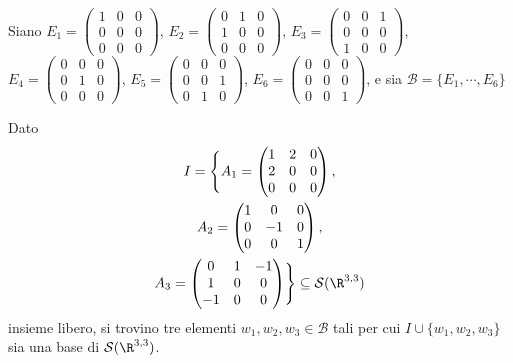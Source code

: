 \documentclass[twoside, 11pt, titlepage]{article}
\begin{document}
{Siano $E_1=\begin{pmatrix}
1 & 0 & 0\\
0 & 0 & 0\\
0 & 0 & 0
\end{pmatrix}$, $E_2=\begin{pmatrix}
0 & 1 & 0\\
1 & 0 & 0\\
0 & 0 & 0
\end{pmatrix}$, $E_3=\begin{pmatrix}
0 & 0 & 1\\
0 & 0 & 0\\
1 & 0 & 0
\end{pmatrix}$, $E_4=\begin{pmatrix}
0 & 0 & 0\\
0 & 1 & 0\\
0 & 0 & 0
\end{pmatrix}$, $E_5=\begin{pmatrix}
0 & 0 & 0\\
0 & 0 & 1\\
0 & 1 & 0
\end{pmatrix}$, $E_6=\begin{pmatrix}
0 & 0 & 0\\
0 & 0 & 0\\
0 & 0 & 1
\end{pmatrix}$, e sia $\mathscr{B}=\{E_1, \cdots, E_6\}$

Dato
\begin{multline*}
I=\Biggl\{A_1=\begin{pmatrix}
1 & 2 & 0\\
2 & 0 & 0\\
0 & 0 & 0
\end{pmatrix},\\ A_2=\begin{pmatrix}
1 & 0 & 0\\
0 & -1 & 0\\
0 & 0 & 1
\end{pmatrix},\\ A_3=\begin{pmatrix}
0 & 1 & -1\\
1 & 0 & 0\\
-1 & 0 & 0
\end{pmatrix}\Biggr\}\subseteq\mathcal{S}(\R^{3,3})
\end{multline*}
insieme libero, si trovino tre elementi $w_1, w_2, w_3\in\mathscr{B}$ tali per cui $I\cup\{w_1, w_2, w_3\}$ sia una base di $\mathcal{S}(\R^{3,3})$.

}
\end{document}
